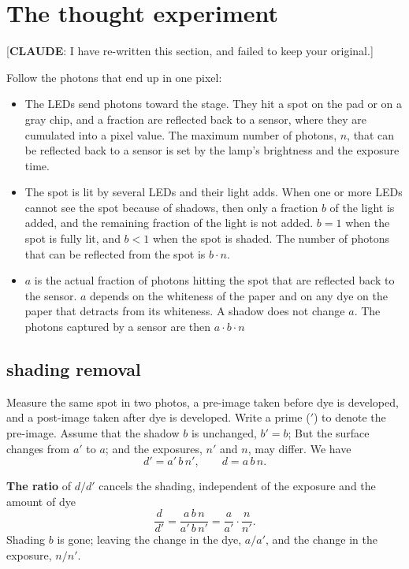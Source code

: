 \documentclass[11pt,letter]{article}
\newcommand{\ToClaude}[1]{[\textbf{CLAUDE}: {#1}]}
\begin{document}
\section{The thought experiment}
\label{sec:thought}

\ToClaude{I have re-written this section, and failed to keep your original.}

Follow the photons that end up in one pixel:
\begin{itemize}[nosep]
  \item The LEDs send photons toward the stage. 
    They hit a spot on the pad or on a gray chip, and a fraction are reflected back to a sensor, where they are cumulated into a pixel value.
    The maximum number of photons, $n$, that can be reflected back to a sensor is set by the lamp's brightness and the exposure time.
  \item The spot is lit by several LEDs and their light adds.
    When one or more LEDs cannot see the spot because of shadows, then only a fraction $b$ of the light is added, and the remaining fraction of the light is not added.
   	$b = 1$ when the spot is fully lit, and $b < 1$ when the spot is shaded.
   	The number of photons that can be reflected from the spot is $b \cdot n$.
  \item $a$ is the actual fraction of photons hitting the spot that are reflected back to the sensor.  
    $a$ depends on the whiteness of the paper and on any dye on the paper that detracts from its whiteness. 
    A shadow does not change $a$.
    The photons captured by a sensor are then $a \cdot b \cdot n$
\end{itemize}

\subsection{shading removal}

Measure the same spot in two photos, a pre-image taken before dye is developed, and a post-image taken after dye is developed.  
Write a prime ($'$) to denote the pre-image.  
Assume that the shadow $b$ is unchanged, $b' = b$; 
But the surface changes from $a'$ to $a$; 
and the exposures, $n'$ and $n$,  may differ.
We have
\begin{equation}
  d' = a'\, b\, n', \qquad d = a\, b\, n .
  \label{eq:te}
\end{equation}

\noindent\textbf{The ratio} of $d / d'$ cancels the shading, independent of the exposure and the amount of dye 
\begin{equation}
  \frac{d}{d'} = \frac{a\, b\, n}{a'\, b\, n'}
  = \frac{a}{a'} \cdot \frac{n}{n'} .
  \label{eq:te-ratio}
\end{equation}
Shading $b$ is gone;  
leaving the change in the dye, $a/a'$, 
and the change in the exposure, $n/n'$.
\end{document}
